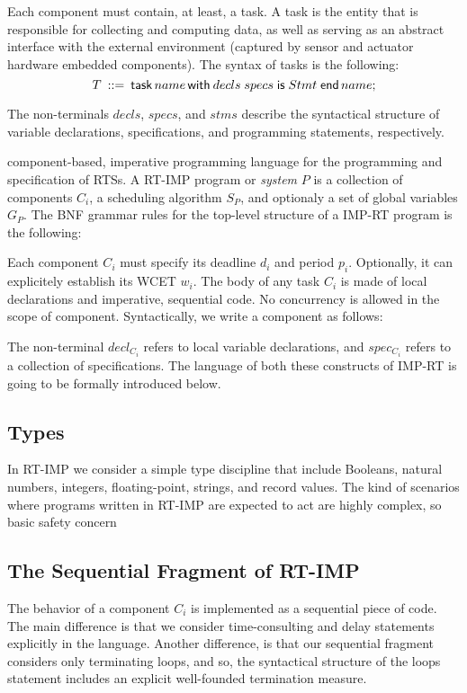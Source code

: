 \documentclass{llncs}
\begin{document}
Each component must contain, at least, a task. A task is the entity that is responsible for collecting and computing data, as well as serving as an abstract interface with the external environment (captured by sensor and actuator hardware embedded components). The syntax of tasks is the following:
$$
T\:::=\:{\sf task}\,name\,{\sf with}\:decls\;specs\;{\sf is}\;Stmt\;{\sf end}\,name;
$$



The non-terminals $decls$, $specs$, and $stms$ describe the syntactical structure of variable declarations, specifications, and programming statements, respectively. 

 component-based, imperative programming language for the programming and specification of RTSs. A RT-IMP program or {\em system} $P$ is a collection of components $C_i$, a scheduling algorithm $S_P$, and optionaly a set of global variables $G_P$. The BNF grammar rules for the top-level structure of a IMP-RT program is the following:


Each component $C_i$ must specify its deadline $d_i$ and period $p_i$. Optionally, it can explicitely establish its WCET $w_i$. The body of any task $C_i$ is made of local declarations and imperative, sequential code. No concurrency is allowed in the scope of component. Syntactically, we write a component as follows:

The non-terminal $decl_{C_i}$ refers to local variable declarations, and $spec_{C_i}$ refers to a collection of specifications. The language of both these constructs of IMP-RT is going to be formally introduced below.

\subsection{Types}

In RT-IMP we consider a simple type discipline that include Booleans, natural numbers, integers, floating-point, strings, and record values. The kind of scenarios where programs written in RT-IMP are expected to act are highly complex, so basic safety concern

\subsection{The Sequential Fragment of RT-IMP}

The behavior of a component $C_i$ is implemented as a sequential piece of code. The main difference is that we consider time-consulting and delay statements explicitly in the language. Another difference, is that our sequential fragment considers only terminating loops, and so, the syntactical structure of the loops statement includes an explicit well-founded termination measure.\\
\end{document}
